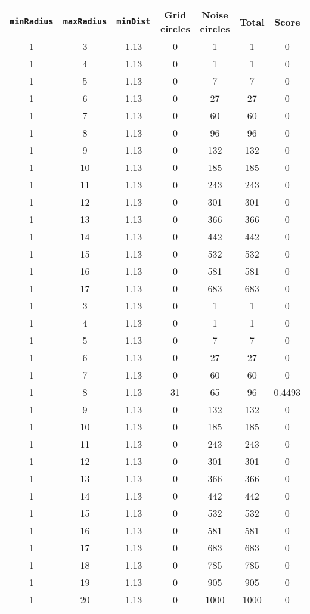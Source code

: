 \documentclass[letterpaper, 12pt]{article}
\begin{document}
\begin{longtable}{|c|c|c|c|c|c|c|}
\hline
\textbf{\texttt{minRadius}} & \textbf{\texttt{maxRadius}} & \textbf{\texttt{minDist}} & \textbf{Grid circles} & \textbf{Noise circles} & \textbf{Total} & \textbf{Score} \\
\hline
1 & 3 & 1.13 & 0 & 1 & 1 & 0 \\
\hline
1 & 4 & 1.13 & 0 & 1 & 1 & 0 \\
\hline
1 & 5 & 1.13 & 0 & 7 & 7 & 0 \\
\hline
1 & 6 & 1.13 & 0 & 27 & 27 & 0 \\
\hline
1 & 7 & 1.13 & 0 & 60 & 60 & 0 \\
\hline
1 & 8 & 1.13 & 0 & 96 & 96 & 0 \\
\hline
1 & 9 & 1.13 & 0 & 132 & 132 & 0 \\
\hline
1 & 10 & 1.13 & 0 & 185 & 185 & 0 \\
\hline
1 & 11 & 1.13 & 0 & 243 & 243 & 0 \\
\hline
1 & 12 & 1.13 & 0 & 301 & 301 & 0 \\
\hline
1 & 13 & 1.13 & 0 & 366 & 366 & 0 \\
\hline
1 & 14 & 1.13 & 0 & 442 & 442 & 0 \\
\hline
1 & 15 & 1.13 & 0 & 532 & 532 & 0 \\
\hline
1 & 16 & 1.13 & 0 & 581 & 581 & 0 \\
\hline
1 & 17 & 1.13 & 0 & 683 & 683 & 0 \\
\hline
1 & 3 & 1.13 & 0 & 1 & 1 & 0 \\
\hline
1 & 4 & 1.13 & 0 & 1 & 1 & 0 \\
\hline
1 & 5 & 1.13 & 0 & 7 & 7 & 0 \\
\hline
1 & 6 & 1.13 & 0 & 27 & 27 & 0 \\
\hline
1 & 7 & 1.13 & 0 & 60 & 60 & 0 \\
\hline
1 & 8 & 1.13 & 31 & 65 & 96 & 0.4493 \\
\hline
1 & 9 & 1.13 & 0 & 132 & 132 & 0 \\
\hline
1 & 10 & 1.13 & 0 & 185 & 185 & 0 \\
\hline
1 & 11 & 1.13 & 0 & 243 & 243 & 0 \\
\hline
1 & 12 & 1.13 & 0 & 301 & 301 & 0 \\
\hline
1 & 13 & 1.13 & 0 & 366 & 366 & 0 \\
\hline
1 & 14 & 1.13 & 0 & 442 & 442 & 0 \\
\hline
1 & 15 & 1.13 & 0 & 532 & 532 & 0 \\
\hline
1 & 16 & 1.13 & 0 & 581 & 581 & 0 \\
\hline
1 & 17 & 1.13 & 0 & 683 & 683 & 0 \\
\hline
1 & 18 & 1.13 & 0 & 785 & 785 & 0 \\
\hline
1 & 19 & 1.13 & 0 & 905 & 905 & 0 \\
\hline
1 & 20 & 1.13 & 0 & 1000 & 1000 & 0 \\
\hline
\end{longtable}
\end{document}
